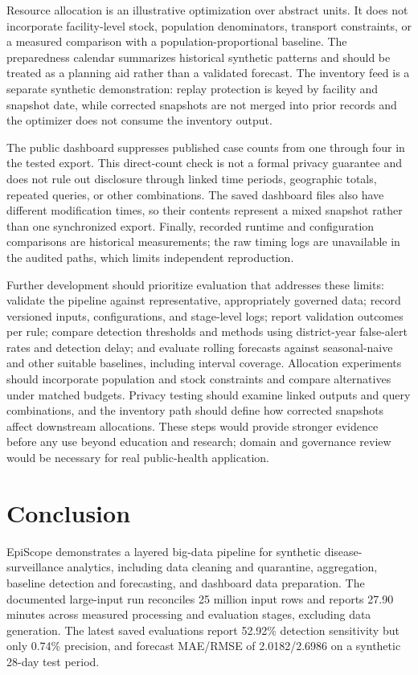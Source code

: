 \documentclass[conference]{IEEEtran}
\begin{document}
Resource allocation is an illustrative optimization over abstract units. It does not incorporate facility-level stock, population denominators, transport constraints, or a measured comparison with a population-proportional baseline. The preparedness calendar summarizes historical synthetic patterns and should be treated as a planning aid rather than a validated forecast. The inventory feed is a separate synthetic demonstration: replay protection is keyed by facility and snapshot date, while corrected snapshots are not merged into prior records and the optimizer does not consume the inventory output.

The public dashboard suppresses published case counts from one through four in the tested export. This direct-count check is not a formal privacy guarantee and does not rule out disclosure through linked time periods, geographic totals, repeated queries, or other combinations. The saved dashboard files also have different modification times, so their contents represent a mixed snapshot rather than one synchronized export. Finally, recorded runtime and configuration comparisons are historical measurements; the raw timing logs are unavailable in the audited paths, which limits independent reproduction.

Further development should prioritize evaluation that addresses these limits: validate the pipeline against representative, appropriately governed data; record versioned inputs, configurations, and stage-level logs; report validation outcomes per rule; compare detection thresholds and methods using district-year false-alert rates and detection delay; and evaluate rolling forecasts against seasonal-naive and other suitable baselines, including interval coverage. Allocation experiments should incorporate population and stock constraints and compare alternatives under matched budgets. Privacy testing should examine linked outputs and query combinations, and the inventory path should define how corrected snapshots affect downstream allocations. These steps would provide stronger evidence before any use beyond education and research; domain and governance review would be necessary for real public-health application.

\section{Conclusion}

EpiScope demonstrates a layered big-data pipeline for synthetic disease-surveillance analytics, including data cleaning and quarantine, aggregation, baseline detection and forecasting, and dashboard data preparation. The documented large-input run reconciles 25 million input rows and reports 27.90 minutes across measured processing and evaluation stages, excluding data generation. The latest saved evaluations report 52.92\% detection sensitivity but only 0.74\% precision, and forecast MAE/RMSE of 2.0182/2.6986 on a synthetic 28-day test period.
\end{document}
